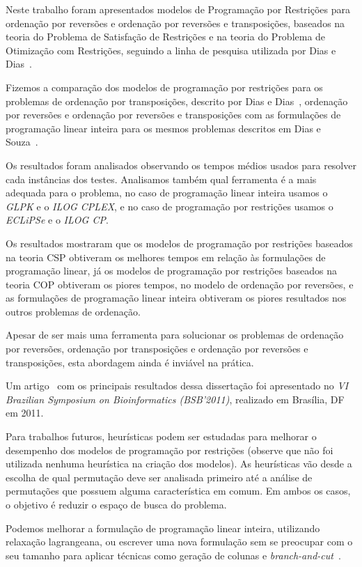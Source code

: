 Neste trabalho foram apresentados modelos de Programação por
Restrições para ordenação por reversões e ordenação por reversões e
transposições, baseados na teoria do Problema de Satisfação de
Restrições e na teoria do Problema de Otimização com Restrições,
seguindo a linha de pesquisa utilizada por Dias e
Dias~\cite{DiasDias*2009}.

Fizemos a comparação dos modelos de programação por restrições para os
problemas de ordenação por transposições, descrito por Dias e
Dias~\cite{DiasDias*2009}, ordenação por reversões e ordenação por
reversões e transposições com as formulações de programação linear
inteira para os mesmos problemas descritos em Dias e
Souza~\cite{DiasSouza*2007}.

Os resultados foram analisados observando os tempos médios usados para
resolver cada instâncias dos testes. Analisamos também qual ferramenta
é a mais adequada para o problema, no caso de programação linear
inteira usamos o \textit{GLPK} e o \textit{ILOG CPLEX}, e no caso de
programação por restrições usamos o \textit{ECLiPSe} e o \textit{ILOG
CP}.

Os resultados mostraram que os modelos de programação por restrições
baseados na teoria CSP obtiveram os melhores tempos em relação às
formulações de programação linear, já os modelos de programação por
restrições baseados na teoria COP obtiveram os piores tempos, no
modelo de ordenação por reversões, e as formulações de programação
linear inteira obtiveram os piores resultados nos outros problemas de
ordenação.

Apesar de ser mais uma ferramenta para solucionar os problemas de
ordenação por reversões, ordenação por transposições e ordenação por
reversões e transposições, esta abordagem ainda é inviável na
prática.

Um artigo~\cite{IizukaDias*2011} com os principais resultados dessa
dissertação foi apresentado no \textit{VI Brazilian Symposium on
Bioinformatics (BSB'2011)}, realizado em Brasília, DF em 2011.

Para trabalhos futuros, heurísticas podem ser estudadas para melhorar
o desempenho dos modelos de programação por restrições (observe que
não foi utilizada nenhuma heurística na criação dos modelos). As
heurísticas vão desde a escolha de qual permutação deve ser analisada
primeiro até a análise de permutações que possuem alguma
característica em comum. Em ambos os casos, o objetivo é reduzir o
espaço de busca do problema.

Podemos melhorar a formulação de programação linear inteira,
utilizando relaxação lagrangeana, ou escrever uma nova formulação sem
se preocupar com o seu tamanho para aplicar técnicas como geração de
colunas
e \textit{branch-and-cut}~\cite{NemhauserWolsey*1988,Wolsey*1998}.
